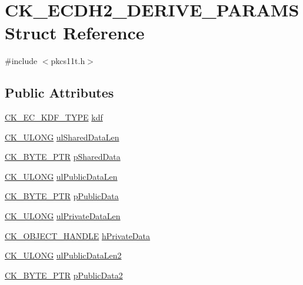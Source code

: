 \hypertarget{struct_c_k___e_c_d_h2___d_e_r_i_v_e___p_a_r_a_m_s}{}\section{C\+K\+\_\+\+E\+C\+D\+H2\+\_\+\+D\+E\+R\+I\+V\+E\+\_\+\+P\+A\+R\+A\+MS Struct Reference}
\label{struct_c_k___e_c_d_h2___d_e_r_i_v_e___p_a_r_a_m_s}


{\ttfamily \#include $<$pkcs11t.\+h$>$}

\subsection*{Public Attributes}
\begin{DoxyCompactItemize}
\item 
\hyperlink{pkcs11t_8h_a25c4c2080a9de6b88ec16c6e9c776e56}{C\+K\+\_\+\+E\+C\+\_\+\+K\+D\+F\+\_\+\+T\+Y\+PE} \hyperlink{struct_c_k___e_c_d_h2___d_e_r_i_v_e___p_a_r_a_m_s_a202b6935c7bbec17e822dfb2d917c97d}{kdf}
\item 
\hyperlink{pkcs11t_8h_a35181858a3b7a0a81f49d180d8f446ef}{C\+K\+\_\+\+U\+L\+O\+NG} \hyperlink{struct_c_k___e_c_d_h2___d_e_r_i_v_e___p_a_r_a_m_s_a1a3d627d6ea0d88686f195a19413600f}{ul\+Shared\+Data\+Len}
\item 
\hyperlink{pkcs11t_8h_a3d7233a4077fbaf7ae76b64da0a62a21}{C\+K\+\_\+\+B\+Y\+T\+E\+\_\+\+P\+TR} \hyperlink{struct_c_k___e_c_d_h2___d_e_r_i_v_e___p_a_r_a_m_s_a827b60434454740b0317e9607b080d5d}{p\+Shared\+Data}
\item 
\hyperlink{pkcs11t_8h_a35181858a3b7a0a81f49d180d8f446ef}{C\+K\+\_\+\+U\+L\+O\+NG} \hyperlink{struct_c_k___e_c_d_h2___d_e_r_i_v_e___p_a_r_a_m_s_a22c377ae785c66b306ee1fe95c29ab47}{ul\+Public\+Data\+Len}
\item 
\hyperlink{pkcs11t_8h_a3d7233a4077fbaf7ae76b64da0a62a21}{C\+K\+\_\+\+B\+Y\+T\+E\+\_\+\+P\+TR} \hyperlink{struct_c_k___e_c_d_h2___d_e_r_i_v_e___p_a_r_a_m_s_ad2b01bb55ad3217666b8ce8fc6ee8f37}{p\+Public\+Data}
\item 
\hyperlink{pkcs11t_8h_a35181858a3b7a0a81f49d180d8f446ef}{C\+K\+\_\+\+U\+L\+O\+NG} \hyperlink{struct_c_k___e_c_d_h2___d_e_r_i_v_e___p_a_r_a_m_s_a0575282c7a62db5bf69a9be3b216d928}{ul\+Private\+Data\+Len}
\item 
\hyperlink{pkcs11t_8h_ad1cdd703196214cd34e6f9f52bc67683}{C\+K\+\_\+\+O\+B\+J\+E\+C\+T\+\_\+\+H\+A\+N\+D\+LE} \hyperlink{struct_c_k___e_c_d_h2___d_e_r_i_v_e___p_a_r_a_m_s_a4fe0a769ab8dbec4bd9f3400bff1b181}{h\+Private\+Data}
\item 
\hyperlink{pkcs11t_8h_a35181858a3b7a0a81f49d180d8f446ef}{C\+K\+\_\+\+U\+L\+O\+NG} \hyperlink{struct_c_k___e_c_d_h2___d_e_r_i_v_e___p_a_r_a_m_s_a6bf8841549189850b62cdb4c81ae6bcb}{ul\+Public\+Data\+Len2}
\item 
\hyperlink{pkcs11t_8h_a3d7233a4077fbaf7ae76b64da0a62a21}{C\+K\+\_\+\+B\+Y\+T\+E\+\_\+\+P\+TR} \hyperlink{struct_c_k___e_c_d_h2___d_e_r_i_v_e___p_a_r_a_m_s_a61ca952359c19f29e7bb868bc136acd3}{p\+Public\+Data2}
\end{DoxyCompactItemize}


